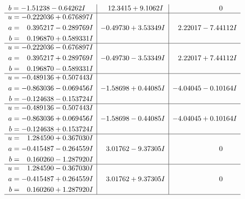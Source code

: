 \documentclass[1p]{elsarticle_modified}
\theoremstyle{definition}
\begin{document}
$$\begin{array}{c|c|c}
\begin{aligned}
b &= -1.51238 - 0.64262 I\end{aligned}
 & \phantom{-}12.3415 + 9.1062 I & \phantom{-0.000000 } 0 \\ \hline\begin{aligned}
u &= -0.222036 + 0.676897 I \\
a &= \phantom{-}0.395217 - 0.289769 I \\
b &= \phantom{-}0.196870 + 0.589331 I\end{aligned}
 & -0.49730 + 3.53349 I & \phantom{-}2.22017 - 7.44112 I \\ \hline\begin{aligned}
u &= -0.222036 - 0.676897 I \\
a &= \phantom{-}0.395217 + 0.289769 I \\
b &= \phantom{-}0.196870 - 0.589331 I\end{aligned}
 & -0.49730 - 3.53349 I & \phantom{-}2.22017 + 7.44112 I \\ \hline\begin{aligned}
u &= -0.489136 + 0.507443 I \\
a &= -0.863036 - 0.069456 I \\
b &= -0.124638 - 0.153724 I\end{aligned}
 & -1.58698 + 0.44085 I & -4.04045 - 0.10164 I \\ \hline\begin{aligned}
u &= -0.489136 - 0.507443 I \\
a &= -0.863036 + 0.069456 I \\
b &= -0.124638 + 0.153724 I\end{aligned}
 & -1.58698 - 0.44085 I & -4.04045 + 0.10164 I \\ \hline\begin{aligned}
u &= \phantom{-}1.284590 + 0.367030 I \\
a &= -0.415487 - 0.264559 I \\
b &= \phantom{-}0.160260 - 1.287920 I\end{aligned}
 & \phantom{-}3.01762 - 9.37305 I & \phantom{-0.000000 } 0 \\ \hline\begin{aligned}
u &= \phantom{-}1.284590 - 0.367030 I \\
a &= -0.415487 + 0.264559 I \\
b &= \phantom{-}0.160260 + 1.287920 I\end{aligned}
 & \phantom{-}3.01762 + 9.37305 I & \phantom{-0.000000 } 0\\
 \hline 
 \end{array}$$\newpage$$\begin{array}{c|c|c}  

\end{array}$$
\end{document}
